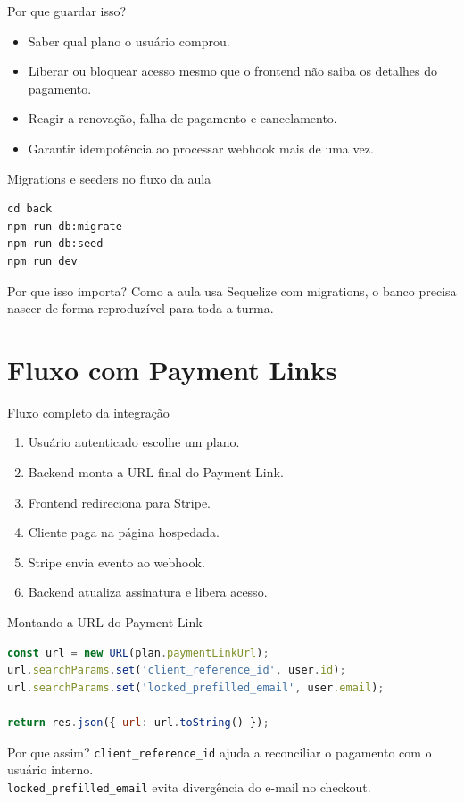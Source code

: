 \documentclass[aspectratio=169]{beamer}
\newcommand{\code}[1]{\texttt{#1}}
\begin{document}
\begin{frame}{Por que guardar isso?}
\begin{itemize}
  \item Saber qual plano o usuário comprou.
  \item Liberar ou bloquear acesso mesmo que o frontend não saiba os detalhes do pagamento.
  \item Reagir a renovação, falha de pagamento e cancelamento.
  \item Garantir idempotência ao processar webhook mais de uma vez.
\end{itemize}
\end{frame}

\begin{frame}[fragile]{Migrations e seeders no fluxo da aula}
\begin{lstlisting}[language={}]
cd back
npm run db:migrate
npm run db:seed
npm run dev
\end{lstlisting}

\begin{block}{Por que isso importa?}
Como a aula usa Sequelize com migrations, o banco precisa nascer de forma reproduzível para toda a turma.
\end{block}
\end{frame}

\section{Fluxo com Payment Links}

\begin{frame}{Fluxo completo da integração}
\begin{enumerate}
  \item Usuário autenticado escolhe um plano.
  \item Backend monta a URL final do Payment Link.
  \item Frontend redireciona para Stripe.
  \item Cliente paga na página hospedada.
  \item Stripe envia evento ao webhook.
  \item Backend atualiza assinatura e libera acesso.
\end{enumerate}
\end{frame}

\begin{frame}[fragile]{Montando a URL do Payment Link}
\begin{lstlisting}[language=JavaScript]
const url = new URL(plan.paymentLinkUrl);
url.searchParams.set('client_reference_id', user.id);
url.searchParams.set('locked_prefilled_email', user.email);

return res.json({ url: url.toString() });
\end{lstlisting}

\begin{exampleblock}{Por que assim?}
\code{client\_reference\_id} ajuda a reconciliar o pagamento com o usuário interno.\\
\code{locked\_prefilled\_email} evita divergência do e-mail no checkout.
\end{exampleblock}
\end{frame}
\end{document}
